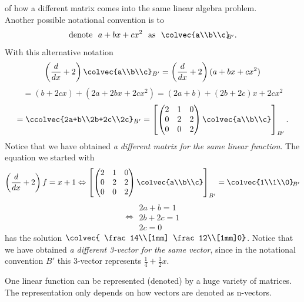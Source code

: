 \begin{example}{of how a different matrix comes into the same linear algebra problem.}\\

\noindent Another possible notational convention  is to
$$\text{denote~~}a+bx+cx^2 \text{~~as~~} \colvec{a\\b\\c}_{\!\!\!B'}.$$
With this alternative notation
$$  \left( \frac{d}{dx}+2\right) \colvec{a\\b\\c}_{B'}
=\left( \frac{d}{dx}+2\right)(a+bx+cx^2)$$
$$
=(b+2cx)+(2a +2bx+2cx^2 ) = (2a+b) + (2b+2c)x+2cx^2
$$
$$
=\ccolvec{2a+b\\2b+2c\\2c}_{B'}
= 
\left[ 
\begin{pmatrix}   
2&1&0\\
0&2&2\\
0&0&2
\end{pmatrix}
\colvec{a\\b\\c}\right]_{B'}.$$
Notice that we have obtained {\it a different matrix for the same linear function}. 
The  equation we started with 
$$
 \left( \frac{d}{dx}+2\right) f=x+1
 \Leftrightarrow
\left[ 
\begin{pmatrix}   
2&1&0\\
0&2&2\\
0&0&2
\end{pmatrix}
\colvec{a\\b\\c}\right]_{B'} = \colvec{1\\1\\0}_{\!B'}$$
$$
\Leftrightarrow
\begin{array}{r}
2a+b=1\\
2b+2c=1\\
2c=0
\end{array}
$$
has the solution 
$\colvec{ \frac14\\[1mm] \frac12\\[1mm]0}$. Notice that we have obtained {\it a different 3-vector for the same vector},  since in the notational convention $B'$ this 3-vector represents $\frac14+\frac12x$. 
\end{example}

One linear function can be represented (denoted) by a huge variety of matrices. %
The representation only depends on how vectors are denoted as n-vectors.



